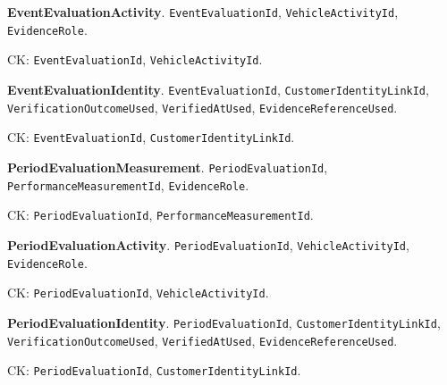 \par\vspace{2.0pt}\noindent\textbf{EventEvaluationActivity}. \texttt{Event\allowbreak{}Evaluation\allowbreak{}Id}, \texttt{Vehicle\allowbreak{}Activity\allowbreak{}Id}, \texttt{Evidence\allowbreak{}Role}.\par\noindent CK: \texttt{Event\allowbreak{}Evaluation\allowbreak{}Id}, \texttt{Vehicle\allowbreak{}Activity\allowbreak{}Id}.
\par\vspace{2.0pt}\noindent\textbf{EventEvaluationIdentity}. \texttt{Event\allowbreak{}Evaluation\allowbreak{}Id}, \texttt{Customer\allowbreak{}Identity\allowbreak{}Link\allowbreak{}Id}, \texttt{Verification\allowbreak{}Outcome\allowbreak{}Used}, \texttt{Verified\allowbreak{}At\allowbreak{}Used}, \texttt{Evidence\allowbreak{}Reference\allowbreak{}Used}.\par\noindent CK: \texttt{Event\allowbreak{}Evaluation\allowbreak{}Id}, \texttt{Customer\allowbreak{}Identity\allowbreak{}Link\allowbreak{}Id}.
\par\vspace{2.0pt}\noindent\textbf{PeriodEvaluationMeasurement}. \texttt{Period\allowbreak{}Evaluation\allowbreak{}Id}, \texttt{Performance\allowbreak{}Measurement\allowbreak{}Id}, \texttt{Evidence\allowbreak{}Role}.\par\noindent CK: \texttt{Period\allowbreak{}Evaluation\allowbreak{}Id}, \texttt{Performance\allowbreak{}Measurement\allowbreak{}Id}.
\par\vspace{2.0pt}\noindent\textbf{PeriodEvaluationActivity}. \texttt{Period\allowbreak{}Evaluation\allowbreak{}Id}, \texttt{Vehicle\allowbreak{}Activity\allowbreak{}Id}, \texttt{Evidence\allowbreak{}Role}.\par\noindent CK: \texttt{Period\allowbreak{}Evaluation\allowbreak{}Id}, \texttt{Vehicle\allowbreak{}Activity\allowbreak{}Id}.
\par\vspace{2.0pt}\noindent\textbf{PeriodEvaluationIdentity}. \texttt{Period\allowbreak{}Evaluation\allowbreak{}Id}, \texttt{Customer\allowbreak{}Identity\allowbreak{}Link\allowbreak{}Id}, \texttt{Verification\allowbreak{}Outcome\allowbreak{}Used}, \texttt{Verified\allowbreak{}At\allowbreak{}Used}, \texttt{Evidence\allowbreak{}Reference\allowbreak{}Used}.\par\noindent CK: \texttt{Period\allowbreak{}Evaluation\allowbreak{}Id}, \texttt{Customer\allowbreak{}Identity\allowbreak{}Link\allowbreak{}Id}.
